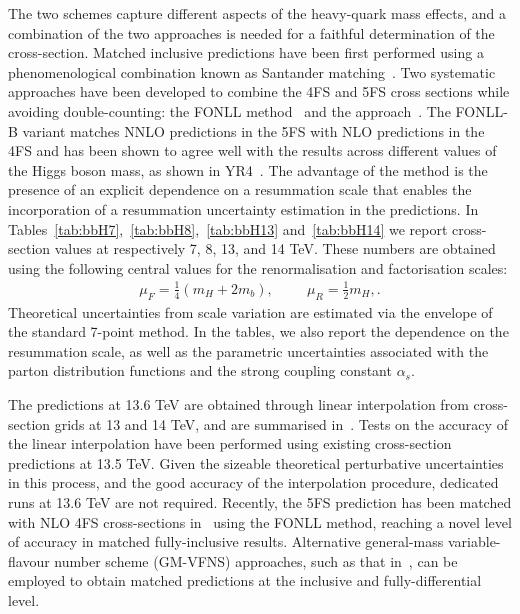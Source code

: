 The two schemes capture different aspects of the heavy-quark mass effects, and a combination of the two approaches is needed for a faithful determination of the cross-section. Matched inclusive predictions have been first performed using a phenomenological combination known as Santander matching~\cite{Harlander:2011aa}. Two systematic approaches have been developed to combine the 4FS and 5FS cross sections while avoiding double-counting: the FONLL method~\cite{Forte:2015hba,Forte:2016sja} and the \nlonnllpart{} approach~\cite{Bonvini:2015pxa,Bonvini:2016fgf}. The FONLL-B variant matches NNLO predictions in the 5FS with NLO predictions in the 4FS and has been shown to agree well with the \nlonnllpart{} results across different values of the Higgs boson mass, as shown in YR4~\cite{LHCHiggsCrossSectionWorkingGroup:2016ypw}. The advantage of the \nlonnllpart{} method is the presence of an explicit dependence on a resummation scale that enables the incorporation of a resummation uncertainty estimation in the predictions. In Tables~\ref{tab:bbH7},~\ref{tab:bbH8},~\ref{tab:bbH13} and~\ref{tab:bbH14} we report cross-section values at respectively 7, 8, 13, and 14 TeV. These numbers are obtained using the following central values for the renormalisation and factorisation scales:
\begin{align}
\mu_{F}=\frac{1}{4}(m_H+2m_b),\hspace{1cm}\mu_R=\frac{1}{2}m_H,.
\end{align}
Theoretical uncertainties from scale variation are estimated via the envelope of the standard 7-point method. In the tables, we also report the dependence on the resummation scale, as well as the parametric uncertainties associated with the parton distribution functions and the strong coupling constant $\alpha_s$.

The predictions at 13.6 TeV are obtained through linear interpolation from cross-section grids at 13 and 14 TeV, and are summarised in~. Tests on the accuracy of the linear interpolation have been performed using existing cross-section predictions at 13.5 TeV. Given the sizeable theoretical perturbative uncertainties in this process, and the good accuracy of the interpolation procedure, dedicated runs at 13.6 TeV are not required. Recently, the \nnnlo{} 5FS prediction has been matched with NLO 4FS cross-sections in~ using the FONLL method, reaching a novel level of accuracy in matched fully-inclusive results. Alternative general-mass variable-flavour number scheme (GM-VFNS) approaches, such as that in~, can be employed to obtain matched predictions at the inclusive and fully-differential level.

